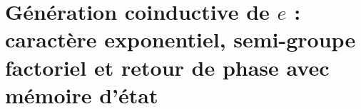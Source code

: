 \chapter{Génération coinductive de \(e\) : caractère exponentiel, semi-groupe factoriel et retour de phase avec mémoire d’état}
\label{chap:p3-final:29:generacion_e}

